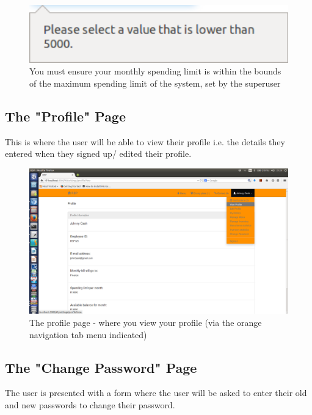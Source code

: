 \documentclass[a4paper,12pt]{article}
\begin{document}
\begin{figure}[H]
  \centering
    \includegraphics[width=1.0\textwidth]{screenshots/limitExeeds.png}
    \caption{You must ensure your monthly spending limit is within the bounds of the maximum spending limit of the system, set by the superuser} 
\end{figure}

\subsection{The "Profile" Page} 
This is where the user will be able to view their profile i.e. the details they entered when they signed up/ edited their profile. 

\begin{figure}[H]
  \centering
    \includegraphics[width=1.0\textwidth]{screenshots/viewProfile.png}
    \caption{The profile page - where you view your profile (via the orange navigation tab menu indicated)} 
\end{figure}

\subsection{The "Change Password" Page} 
The user is presented with a form where the user will be asked to enter their old and new passwords to change their password. 
\end{document}
